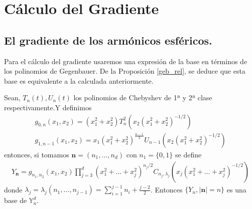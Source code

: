 \label{ch:gradiente}
\chapter[Cálculo del Gradiente]
		{Cálculo del Gradiente}
\section{El gradiente de los armónicos esféricos.}
Para el cálculo del gradiente usaremos una expresión de la base en términos de los polinomios de Gegenbauer. De la Proposición \ref{geb_rel}, se deduce que esta base es equivalente a la calculada anteriormente.
\\
\begin{thm}
Sean, $T_{n}(t),U_{n}(t)$ los polinomios de Chebyshev de 1ª y 2ª clase respectivamente.Y definimos
\begin{gather*}
 g_{0,n}(x_1,x_2) = (x_1^2+x_2^2)T_n^2(x_2(x_1^2+x_2^2)^{-1/2})
\\
g_{1,n-1}(x_1,x_2) = x_1(x_1^2+x_2^2)^{\frac{n-1}{2}}U_{n-1}(x_2(x_1^2+x_2^2)^{-1/2})
\end{gather*}
entonces, si tomamos $\textbf{n}=(n_1,...,n_d)$ con $n_1 = \{0,1\}$ se define
\begin{gather*}
Y_\textbf{n} = g_{n_1,n_2}(x_1,x_2)\prod_{j=3}^{d}(x_1^2+...+x_j^2)^{n_j/2}C_{n_j,\lambda_j}(x_j(x_1^2+...+x_j^2)^{-1/2})
\end{gather*}
donde $\lambda_j =\lambda_j(n_1,...,n_{j-1}) = \sum_{i=1}^{j-1}n_i + \frac{j-2}{2}$. Entonces $\{Y_n,|\textbf{n}|=n\}$ es una base de $\mathds{Y}_{n}^{d}$.
\end{thm}
\medskip

